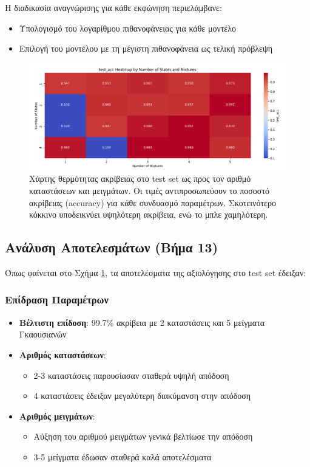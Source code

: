 \documentclass[a4paper,12pt]{article}
\begin{document}
Η διαδικασία αναγνώρισης για κάθε εκφώνηση περιελάμβανε:
\begin{itemize}
    \item Υπολογισμό του λογαρίθμου πιθανοφάνειας για κάθε μοντέλο
    \item Επιλογή του μοντέλου με τη μέγιστη πιθανοφάνεια ως τελική πρόβλεψη
\end{itemize}

\begin{figure}[h]
    \centering
    \includegraphics[width=\textwidth]{hmm_test_acc_heatmap.png}
    \caption{Χάρτης θερμότητας ακρίβειας στο test set ως προς τον αριθμό καταστάσεων και μειγμάτων.
        Οι τιμές αντιπροσωπεύουν το ποσοστό ακρίβειας (accuracy) για κάθε συνδυασμό παραμέτρων.
        Σκοτεινότερο κόκκινο υποδεικνύει υψηλότερη ακρίβεια, ενώ το μπλε χαμηλότερη.}
    \label{fig:test_acc_heatmap}
\end{figure}

\subsection*{Ανάλυση Αποτελεσμάτων (Βήμα 13)}
Όπως φαίνεται στο Σχήμα \ref{fig:test_acc_heatmap}, τα αποτελέσματα της αξιολόγησης στο test set έδειξαν:

\subsubsection*{Επίδραση Παραμέτρων}
\begin{itemize}
    \item \textbf{Βέλτιστη επίδοση}: 99.7\% ακρίβεια με 2 καταστάσεις και 5 μείγματα Γκαουσιανών
    \item \textbf{Αριθμός καταστάσεων}:
          \begin{itemize}
              \item 2-3 καταστάσεις παρουσίασαν σταθερά υψηλή απόδοση
              \item 4 καταστάσεις έδειξαν μεγαλύτερη διακύμανση στην απόδοση
          \end{itemize}
    \item \textbf{Αριθμός μειγμάτων}:
          \begin{itemize}
              \item Αύξηση του αριθμού μειγμάτων γενικά βελτίωσε την απόδοση
              \item 3-5 μείγματα έδωσαν σταθερά καλά αποτελέσματα
          \end{itemize}
\end{itemize}
\end{document}
